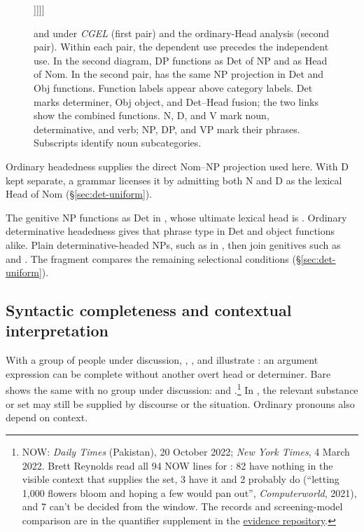 \documentclass[12pt]{article}
\newcommand{\synnode}[2]{\shortstack{\footnotesize #1\\#2}}
\begin{document}
\begin{figure}[H]
\begin{minipage}[t]{.49\linewidth}
\begin{minipage}[t]{.42\linewidth}
\begin{forest}
 [{\synnode{Obj}{NP}}
  [{\synnode{Head}{Nom}}, head edge
   [{\synnode{Head}{D}}, head edge [\mention{some}]]]]]
\end{forest}
\end{minipage}
\end{minipage}
\caption{ and  under \textit{CGEL} (first pair) and the ordinary-Head analysis (second pair). Within each pair, the dependent use precedes the independent use. In the second diagram, DP functions as Det of NP and as Head of Nom. In the second pair,  has the same NP projection in Det and Obj functions. Function labels appear above category labels. Det marks determiner, Obj object, and Det--Head fusion; the two links show the combined functions. N, D, and V mark noun, determinative, and verb; NP, DP, and VP mark their phrases. Subscripts identify noun subcategories.}\label{fig:some}
\end{figure}

Ordinary headedness supplies the direct Nom--NP projection used here. With D kept separate, a grammar licenses it by admitting both N and D as the lexical Head of Nom (§\ref{sec:det-uniform}).

The genitive NP  functions as Det in , whose ultimate lexical head is . Ordinary determinative headedness gives  that phrase type in Det and object functions alike. Plain determinative-headed NPs, such as  in , then join genitives such as  and . The fragment compares the remaining selectional conditions (§\ref{sec:det-uniform}).

\subsection{Syntactic completeness and contextual interpretation}\label{sec:saturation}

With a group of people under discussion, , , and  illustrate : an argument expression can be complete without another overt head or determiner. Bare  shows the same with no group under discussion:  and .\footnote{NOW: \textit{Daily Times} (Pakistan), 20 October 2022; \textit{New York Times}, 4 March 2022. Brett Reynolds read all 94 NOW lines for : 82 have nothing in the visible context that supplies the set, 3 have it and 2 probably do (\enquote{letting 1,000 flowers bloom and hoping a few would pan out}, \textit{Computerworld}, 2021), and 7 can't be decided from the window. The records and screening-model comparison are in the quantifier supplement in the \href{https://github.com/BrettRey/determinatives-as-nouns}{evidence repository}.} In , the relevant substance or set may still be supplied by discourse or the situation. Ordinary pronouns also depend on context.
\end{document}
